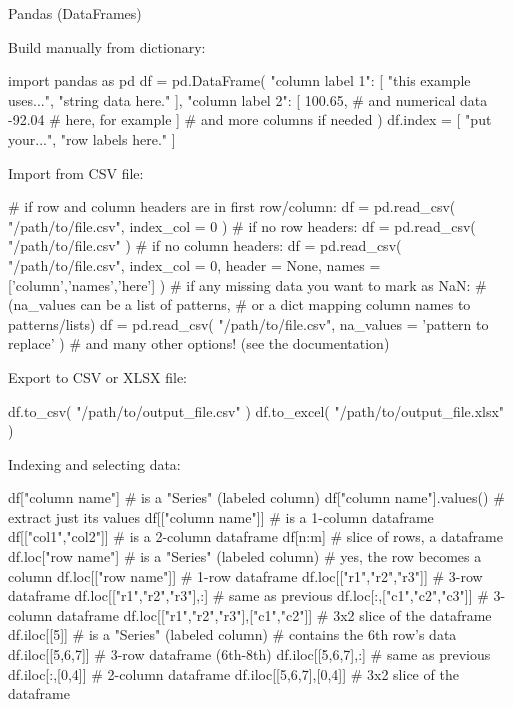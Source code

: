 \documentclass[a4paper,landscape,columns=3]{cheatsheet}
\def\sect#1{\begin{tcolorbox}[colback=blue!5!white,colframe=blue!75!black,size=title,leftrule=2mm]
    \large #1
\end{tcolorbox}}
\begin{document}
\sect{Pandas (DataFrames)}

Build manually from dictionary:
\begin{python}
import pandas as pd
df = pd.DataFrame( {
    "column label 1": [
        "this example uses...",
        "string data here."
    ],
    "column label 2": [
        100.65,  # and numerical data
        -92.04   # here, for example
    ]
    # and more columns if needed
} )
df.index = [
    "put your...",
    "row labels here."
]
\end{python}

Import from CSV file:
\begin{python}
# if row and column headers are in first row/column:
df = pd.read_csv( "/path/to/file.csv",
                  index_col = 0 )
# if no row headers:
df = pd.read_csv( "/path/to/file.csv" )
# if no column headers:
df = pd.read_csv( "/path/to/file.csv",
                  index_col = 0, header = None,
                  names = ['column','names','here'] )
# if any missing data you want to mark as NaN:
# (na_values can be a list of patterns,
# or a dict mapping column names to patterns/lists)
df = pd.read_csv( "/path/to/file.csv",
                  na_values = 'pattern to replace' )
# and many other options!  (see the documentation)
\end{python}

Export to CSV or XLSX file:
\begin{python}
df.to_csv( "/path/to/output_file.csv" )
df.to_excel( "/path/to/output_file.xlsx" )
\end{python}

Indexing and selecting data:

\begin{python}
df["column name"]    # is a "Series" (labeled column)
df["column name"].values()
                     # extract just its values
df[["column name"]]  # is a 1-column dataframe
df[["col1","col2"]]  # is a 2-column dataframe
df[n:m]              # slice of rows, a dataframe
df.loc["row name"]   # is a "Series" (labeled column)
                     # yes, the row becomes a column
df.loc[["row name"]] # 1-row dataframe
df.loc[["r1","r2","r3"]]
                     # 3-row dataframe
df.loc[["r1","r2","r3"],:]
                     # same as previous
df.loc[:,["c1","c2","c3"]]
                     # 3-column dataframe
df.loc[["r1","r2","r3"],["c1","c2"]]
                     # 3x2 slice of the dataframe
df.iloc[[5]]         # is a "Series" (labeled column)
                     # contains the 6th row's data
df.iloc[[5,6,7]]     # 3-row dataframe (6th-8th)
df.iloc[[5,6,7],:]   # same as previous
df.iloc[:,[0,4]]     # 2-column dataframe
df.iloc[[5,6,7],[0,4]]
                     # 3x2 slice of the dataframe
\end{python}
\end{document}
